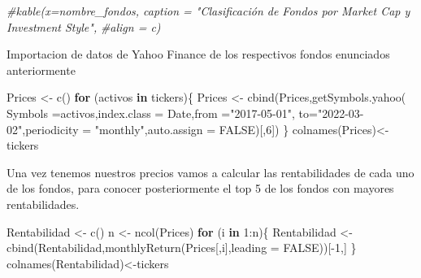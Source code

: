 \documentclass[
  12pt,
]{article}
\newenvironment{Shaded}{\begin{snugshade}}{\end{snugshade}}
\newcommand{\AttributeTok}[1]{\textcolor[rgb]{0.77,0.63,0.00}{#1}}
\newcommand{\CommentTok}[1]{\textcolor[rgb]{0.56,0.35,0.01}{\textit{#1}}}
\newcommand{\ConstantTok}[1]{\textcolor[rgb]{0.00,0.00,0.00}{#1}}
\newcommand{\ControlFlowTok}[1]{\textcolor[rgb]{0.13,0.29,0.53}{\textbf{#1}}}
\newcommand{\DecValTok}[1]{\textcolor[rgb]{0.00,0.00,0.81}{#1}}
\newcommand{\FunctionTok}[1]{\textcolor[rgb]{0.00,0.00,0.00}{#1}}
\newcommand{\NormalTok}[1]{#1}
\newcommand{\OtherTok}[1]{\textcolor[rgb]{0.56,0.35,0.01}{#1}}
\newcommand{\SpecialCharTok}[1]{\textcolor[rgb]{0.00,0.00,0.00}{#1}}
\newcommand{\StringTok}[1]{\textcolor[rgb]{0.31,0.60,0.02}{#1}}
\begin{document}
\begin{Shaded}
\begin{Highlighting}[]
\CommentTok{\#kable(x=nombre\_fondos, caption = "Clasificación de Fondos por Market Cap y Investment Style",}
\CommentTok{\#align = \textquotesingle{}c\textquotesingle{})}
\end{Highlighting}
\end{Shaded}

Importacion de datos de Yahoo Finance de los respectivos fondos
enunciados anteriormente

\begin{Shaded}
\begin{Highlighting}[]
\NormalTok{Prices }\OtherTok{\textless{}{-}} \FunctionTok{c}\NormalTok{()}
\ControlFlowTok{for}\NormalTok{ (activos }\ControlFlowTok{in}\NormalTok{ tickers)\{}
\NormalTok{  Prices }\OtherTok{\textless{}{-}} \FunctionTok{cbind}\NormalTok{(Prices,}\FunctionTok{getSymbols.yahoo}\NormalTok{(}
    \AttributeTok{Symbols =}\NormalTok{activos,}\AttributeTok{index.class  =} \StringTok{\textquotesingle{}Date\textquotesingle{}}\NormalTok{,}\AttributeTok{from =}\StringTok{"2017{-}05{-}01"}\NormalTok{,}
    \AttributeTok{to=}\StringTok{"2022{-}03{-}02"}\NormalTok{,}\AttributeTok{periodicity =} \StringTok{"monthly"}\NormalTok{,}\AttributeTok{auto.assign =} \ConstantTok{FALSE}\NormalTok{)[,}\DecValTok{6}\NormalTok{])}
\NormalTok{\}}
\FunctionTok{colnames}\NormalTok{(Prices)}\OtherTok{\textless{}{-}}\NormalTok{tickers}
\end{Highlighting}
\end{Shaded}

Una vez tenemos nuestros precios vamos a calcular las rentabilidades de
cada uno de los fondos, para conocer posteriormente el top 5 de los
fondos con mayores rentabilidades.

\begin{Shaded}
\begin{Highlighting}[]
\NormalTok{Rentabilidad }\OtherTok{\textless{}{-}} \FunctionTok{c}\NormalTok{()}
\NormalTok{n }\OtherTok{\textless{}{-}} \FunctionTok{ncol}\NormalTok{(Prices)}
\ControlFlowTok{for}\NormalTok{ (i }\ControlFlowTok{in} \DecValTok{1}\SpecialCharTok{:}\NormalTok{n)\{}
\NormalTok{    Rentabilidad }\OtherTok{\textless{}{-}} \FunctionTok{cbind}\NormalTok{(Rentabilidad,}\FunctionTok{monthlyReturn}\NormalTok{(Prices[,i],}\AttributeTok{leading =} \ConstantTok{FALSE}\NormalTok{))[}\SpecialCharTok{{-}}\DecValTok{1}\NormalTok{,]}
\NormalTok{\}}
\FunctionTok{colnames}\NormalTok{(Rentabilidad)}\OtherTok{\textless{}{-}}\NormalTok{tickers  }
\end{Highlighting}
\end{Shaded}
\end{document}

